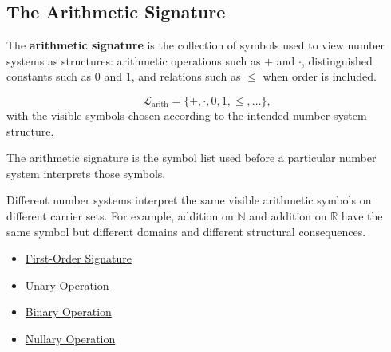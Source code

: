 \subsection*{The Arithmetic Signature}
\label{subsec:arithmetic-signature}

\begin{definition}
\label{def:arithmetic-signature}
The \textbf{arithmetic signature} is the collection of symbols used to view
number systems as structures: arithmetic operations such as $+$ and $\cdot$,
distinguished constants such as $0$ and $1$, and relations such as $\leq$ when
order is included.
\end{definition}

\begin{remark*}
\[
\mathcal{L}_{\mathrm{arith}}
=\{+,\cdot,0,1,\leq,\ldots\},
\]
with the visible symbols chosen according to the intended number-system
structure.
\end{remark*}

\begin{remark*}
The arithmetic signature is the symbol list used before a particular number
system interprets those symbols.
\end{remark*}


\begin{remark*}[Interpretation]
Different number systems interpret the same visible arithmetic symbols on
different carrier sets.  For example, addition on $\mathbb{N}$ and addition on
$\mathbb{R}$ have the same symbol but different domains and different
structural consequences.
\end{remark*}

\begin{dependencies}
\begin{itemize}
  \item \hyperref[def:first-order-signature]{First-Order Signature}
  \item \hyperref[def:unary-operation]{Unary Operation}
  \item \hyperref[def:binary-operation]{Binary Operation}
  \item \hyperref[def:nullary-operation]{Nullary Operation}
\end{itemize}
\end{dependencies}
